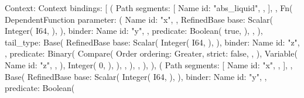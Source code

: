 \documentclass[
  oneside,
  english,
  coorientadorbanca,
  noabntexcite
]{ufsc-thesis-rn46-2019}
\begin{document}
\begin{rustcode}
  Context: Context {
    bindings: [
        (
            Path {
                segments: [
                    Name {
                        id: "abs_liquid",
                    },
                ],
            },
            Fn(
                DependentFunction {
                    parameter: (
                        Name {
                            id: "x",
                        },
                        RefinedBase {
                            base: Scalar(
                                Integer(
                                    I64,
                                ),
                            ),
                            binder: Name {
                                id: "y",
                            },
                            predicate: Boolean(
                                true,
                            ),
                        },
                    ),
                    tail_type: Base(
                        RefinedBase {
                            base: Scalar(
                                Integer(
                                    I64,
                                ),
                            ),
                            binder: Name {
                                id: "z",
                            },
                            predicate: Binary(
                                Compare(
                                    Order {
                                        ordering: Greater,
                                        strict: false,
                                    },
                                ),
                                Variable(
                                    Name {
                                        id: "z",
                                    },
                                ),
                                Integer(
                                    0,
                                ),
                            ),
                        },
                    ),
                },
            ),
        ),
        (
            Path {
                segments: [
                    Name {
                        id: "x",
                    },
                ],
            },
            Base(
                RefinedBase {
                    base: Scalar(
                        Integer(
                            I64,
                        ),
                    ),
                    binder: Name {
                        id: "y",
                    },
                    predicate: Boolean(
}}
\end{rustcode}
\end{document}
